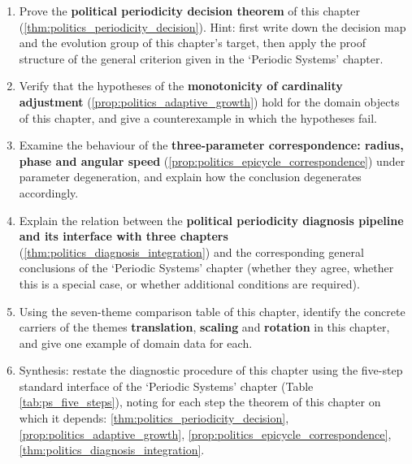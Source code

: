 \begin{enumerate}[leftmargin=3em, label=\textbf{Exercise \arabic*}]
    \item Prove the \textbf{political periodicity decision theorem} of this chapter (\ref{thm:politics_periodicity_decision}). Hint: first write down the decision map and the evolution group of this chapter's target, then apply the proof structure of the general criterion given in the `Periodic Systems' chapter.

    \item Verify that the hypotheses of the \textbf{monotonicity of cardinality adjustment} (\ref{prop:politics_adaptive_growth}) hold for the domain objects of this chapter, and give a counterexample in which the hypotheses fail.

    \item Examine the behaviour of the \textbf{three-parameter correspondence: radius, phase and angular speed} (\ref{prop:politics_epicycle_correspondence}) under parameter degeneration, and explain how the conclusion degenerates accordingly.

    \item Explain the relation between the \textbf{political periodicity diagnosis pipeline and its interface with three chapters} (\ref{thm:politics_diagnosis_integration}) and the corresponding general conclusions of the `Periodic Systems' chapter (whether they agree, whether this is a special case, or whether additional conditions are required).

    \item Using the seven-theme comparison table of this chapter, identify the concrete carriers of the themes \textbf{translation}, \textbf{scaling} and \textbf{rotation} in this chapter, and give one example of domain data for each.

    \item Synthesis: restate the diagnostic procedure of this chapter using the five-step standard interface of the `Periodic Systems' chapter (Table \ref{tab:ps_five_steps}), noting for each step the theorem of this chapter on which it depends: \ref{thm:politics_periodicity_decision}, \ref{prop:politics_adaptive_growth}, \ref{prop:politics_epicycle_correspondence}, \ref{thm:politics_diagnosis_integration}.
\end{enumerate}


